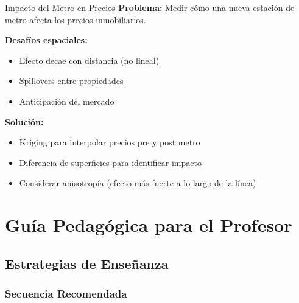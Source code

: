 \documentclass[12pt,a4paper]{article}
\begin{document}
\begin{ejemplo}{Impacto del Metro en Precios}
\textbf{Problema:} Medir cómo una nueva estación de metro afecta los precios inmobiliarios.

\textbf{Desafíos espaciales:}
\begin{itemize}
    \item Efecto decae con distancia (no lineal)
    \item Spillovers entre propiedades
    \item Anticipación del mercado
\end{itemize}

\textbf{Solución:}
\begin{itemize}
    \item Kriging para interpolar precios pre y post metro
    \item Diferencia de superficies para identificar impacto
    \item Considerar anisotropía (efecto más fuerte a lo largo de la línea)
\end{itemize}
\end{ejemplo}

\section{Guía Pedagógica para el Profesor}

\subsection{Estrategias de Enseñanza}

\subsubsection{Secuencia Recomendada}
\end{document}
